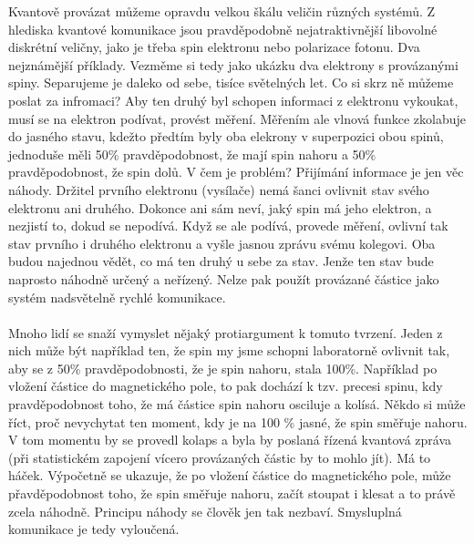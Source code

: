 \documentclass{../../../../style/mkimain}
\begin{document}
\noindent{}
\klein

Kvantově provázat můžeme opravdu velkou škálu veličin různých systémů.
Z hlediska kvantové komunikace jsou pravděpodobně nejatraktivnější libovolné diskrétní veličny,
jako je třeba spin elektronu nebo polarizace fotonu. Dva nejznámější příklady.
Vezměme si tedy jako ukázku dva elektrony s provázanými spiny. Separujeme je daleko od sebe, tisíce světelných let.
Co si skrz ně můžeme poslat za infromaci? Aby ten druhý byl schopen informaci z elektronu vykoukat,
musí se na elektron podívat, provést měření. Měřením ale vlnová funkce zkolabuje do jasného stavu,
kdežto předtím byly oba elekrony v superpozici obou spinů, jednoduše měli 50\% pravděpodobnost, že mají spin nahoru
a 50\% pravděpodobnost, že spin dolů. V čem je problém? Přijímání informace je jen věc náhody. Držitel prvního elektronu (vysílače)
nemá šanci ovlivnit stav svého elektronu ani druhého. Dokonce ani sám neví, jaký spin má jeho elektron, a nezjistí to, dokud se nepodívá.
Když se ale podívá, provede měření, ovlivní tak stav prvního i druhého elektronu a vyšle jasnou zprávu svému kolegovi.
Oba budou najednou vědět, co má ten druhý u sebe za stav. Jenže ten stav bude naprosto náhodně určený a neřízený.
Nelze pak použít provázané částice jako systém nadsvětelně rychlé komunikace.
\\\\
Mnoho lidí se snaží vymyslet nějaký protiargument k tomuto tvrzení. Jeden z nich může být například ten,
že spin my jsme schopni laboratorně ovlivnit tak, aby se z 50\% pravděpodobnosti, že je spin nahoru, stala 100\%.
Například po vložení částice do magnetického pole, to pak dochází k tzv. precesi spinu, kdy pravděpodobnost toho,
že má částice spin nahoru osciluje a kolísá. Někdo si může říct, proč nevychytat ten moment, kdy je na 100 \% jasné, že spin směřuje nahoru.
V tom momentu by se provedl kolaps a byla by poslaná řízená kvantová zpráva (při statistickém zapojení vícero provázaných částic by to mohlo jít). Má to háček. Výpočetně se ukazuje,
že po vložení částice do magnetického pole, může přavděpodobnost toho, že spin směřuje nahoru, začít stoupat i klesat 
a to právě zcela náhodně. Principu náhody se člověk jen tak nezbaví. Smysluplná komunikace je tedy vyloučená.
\end{document}
